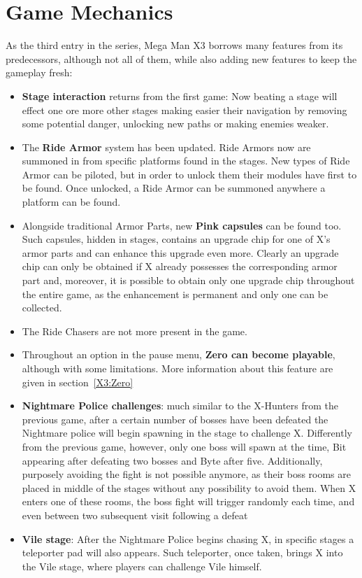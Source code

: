 \section{Game Mechanics}
As the third entry in the series, Mega Man X3 borrows many features from its predecessors, although not all of them, while also adding new features to keep the gameplay fresh:
\begin{itemize}
	\item \textbf{Stage interaction} returns from the first game: Now beating a stage will effect one ore more other stages making easier their navigation by removing some potential danger, unlocking new paths or making enemies weaker.
	\item The \textbf{Ride Armor} system has been updated. Ride Armors now are summoned in from specific platforms found in the stages. New types of Ride Armor can be piloted, but in order to unlock them their modules have first to be found. Once unlocked, a Ride Armor can be summoned anywhere a platform can be found.
	\item Alongside traditional Armor Parts, new \textbf{Pink capsules} can be found too. Such capsules, hidden in stages, contains an upgrade chip for one of X's armor parts and can enhance this upgrade even more. Clearly an upgrade chip can only be obtained if X already possesses the corresponding armor part and, moreover, it is possible to obtain only one upgrade chip throughout the entire game, as the enhancement is permanent and only one can be collected.
	\item The Ride Chasers are not more present in the game.
	\item Throughout an option in the pause menu, \textbf{Zero can become playable}, although with some limitations. More information about this feature are given in section~\ref{X3:Zero}
	\item \textbf{Nightmare Police challenges}: much similar to the X-Hunters from the previous game, after a certain number of bosses have been defeated the Nightmare police will begin spawning in the stage to challenge X. Differently from the previous game, however, only one boss will spawn at the time, Bit appearing after defeating two bosses and Byte after five. Additionally, purposely avoiding the fight is not possible anymore, as their boss rooms are placed in middle of the stages without any possibility to avoid them. When X enters one of these rooms, the boss fight will trigger randomly each time, and even between two subsequent visit following a defeat
	\item \textbf{Vile stage}: After the Nightmare Police begins chasing X, in specific stages a teleporter pad will also appears. Such teleporter, once taken, brings X into the Vile stage, where players can challenge Vile himself.
\end{itemize}
